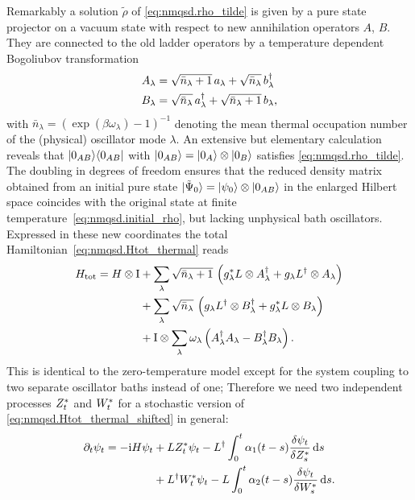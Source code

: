 Remarkably a solution $\tilde\rho$ of \autoref{eq:nmqsd.rho_tilde} is given by a pure state projector on a vacuum state with respect to new annihilation operators $A$, $B$.
They are connected to the old ladder operators by a temperature dependent Bogoliubov transformation
\begin{align*}
  A_\lambda &= \sqrt{\bar n_\lambda + 1} \, a_\lambda + \sqrt{\bar n_\lambda} \, b^\dagger_\lambda \\
  B_\lambda &= \sqrt{\bar n_\lambda} \, a^\dagger_\lambda + \sqrt{\bar n_\lambda + 1} \, b_\lambda,
\end{align*}
with $\bar n_\lambda = \left( \exp(\beta \omega_\lambda) - 1 \right)^{-1}$ denoting the mean thermal occupation number of the (physical) oscillator mode $\lambda$.
An extensive but elementary calculation \cite{} reveals that $| 0_{AB} \rangle\langle 0_{AB} |$ with $| 0_{AB} \rangle = | 0_A \rangle \otimes | 0_B \rangle$ satisfies \autoref{eq:nmqsd.rho_tilde}.
The doubling in degrees of freedom ensures that the reduced density matrix obtained from an initial pure state $| \tilde\Psi_0 \rangle = | \psi_0 \rangle\otimes| 0_{AB} \rangle$ in the enlarged Hilbert space coincides with the original state at finite temperature~\ref{eq:nmqsd.initial_rho}, but lacking unphysical bath oscillators.
Expressed in these new coordinates the total Hamiltonian~\ref{eq:nmqsd.Htot_thermal} reads
\begin{align}
  H_\mathrm{tot} = H\otimes\mathrm{I} &+ \sum_\lambda \sqrt{\bar n_\lambda + 1} \, \left({g}^*_\lambda L\otimes A^\dagger_\lambda + g_\lambda L^\dagger\otimes A_\lambda \right) \nonumber \\
        \label{eq:nmqsd.Htot_thermal_shifted}
        &+ \sum_\lambda \sqrt{\bar n_\lambda} \, \left( g_\lambda L^\dagger\otimes B^\dagger_\lambda  + {g}^*_\lambda L \otimes B_\lambda \right) \\
        &+ \mathrm{I} \otimes \sum_\lambda \omega_\lambda \left( A^\dagger_\lambda A_\lambda - B^\dagger_\lambda B_\lambda \right). \nonumber
\end{align}
This is identical to the zero-temperature model except for the system coupling to two separate oscillator baths instead of one;
Therefore we need two independent processes ${Z}^*_t$ and ${W}^*_t$ for a stochastic version of \autoref{eq:nmqsd.Htot_thermal_shifted} in general:
\begin{align}
  \partial_t \psi_t = -\mathrm{i}H\psi_t &+ L{Z}^*_t\psi_t - L^\dagger\int_0^t \alpha_1(t-s) \frac{\delta \psi_t}{\delta {Z}^*_s} \, \mathrm{d} s \nonumber \\
  &+ L^\dagger {W}^*_t \psi_t - L\int_0^t \alpha_2(t-s) \frac{\delta\psi_t}{\delta {W}^*_s} \, \mathrm{d} s.
  \label{eq:nmqsd.nmsse_thermal_2processes}
\end{align}
